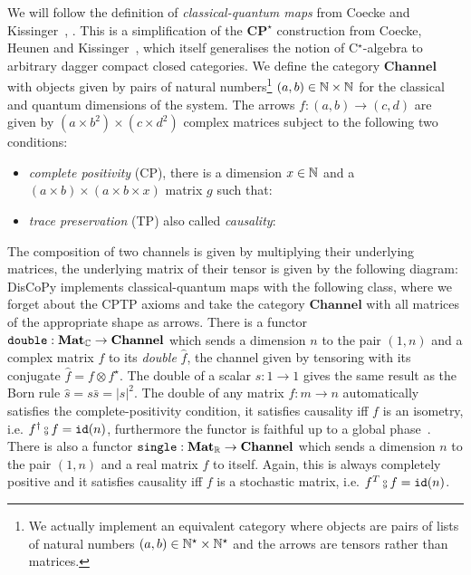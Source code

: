 We will follow the definition of \emph{classical-quantum maps} from Coecke and Kissinger~\cite[Chapter~8]{CoeckeKissinger17}, .
This is a simplification of the $\mathbf{CP^\star}$ construction from Coecke, Heunen and Kissinger~\cite{CoeckeEtAl14a}, which itself generalises the notion of C$^\star$-algebra to arbitrary dagger compact closed categories.
We define the category $\mathbf{Channel}$ with objects given by pairs of natural numbers\footnote
{We actually implement an equivalent category where objects are pairs of lists of natural numbers $(a, b) \in \mathbb{N}^\star \times \mathbb{N}^\star$ and the arrows are tensors rather than matrices.} $(a, b) \in \mathbb{N} \times \mathbb{N}$ for the classical and quantum dimensions of the system.
The arrows $f : (a, b) \to (c, d)$ are given by $(a \times b^2) \times (c \times d^2)$ complex matrices subject to the following two conditions:
\begin{itemize}
\item \emph{complete positivity} (CP), there is a dimension $x \in \mathbb{N}$ and a $(a \times b) \times (a \times b \times x)$ matrix $g$ such that:
\item \emph{trace preservation} (TP) also called \emph{causality}:
\end{itemize}
The composition of two channels is given by multiplying their underlying matrices, the underlying matrix of their tensor is given by the following diagram:
DisCoPy implements classical-quantum maps with the following  class, where we forget about the CPTP axioms and take the category $\mathbf{Channel}$ with all matrices of the appropriate shape as arrows.
There is a functor $\mathtt{double} : \mathbf{Mat}_{\mathbb{C}} \to \mathbf{Channel}$ which sends a dimension $n$ to the pair $(1, n)$ and a complex matrix $f$ to its \emph{double} $\widehat{f}$, the channel given by tensoring with its conjugate $\widehat{f} = f \otimes f^\star$.
The double of a scalar $s : 1 \to 1$ gives the same result as the Born rule $\hat{s} = s \bar{s} = \vert s \vert^2$.
The double of any matrix $f : m \to n$ automatically satisfies the complete-positivity condition, it satisfies causality iff $f$ is an isometry, i.e. $f^\dagger \fcmp f = \id(n)$, furthermore the functor is faithful up to a global phase~\cite[Proposition~6.6]{CoeckeKissinger17}.
There is also a functor $\mathtt{single} : \mathbf{Mat}_{\mathbb{R}} \to \mathbf{Channel}$ which sends a dimension $n$ to the pair $(1, n)$ and a real matrix $f$ to itself.
Again, this is always completely positive and it satisfies causality iff $f$ is a stochastic matrix, i.e. $f^T \fcmp f = \id(n)$.

